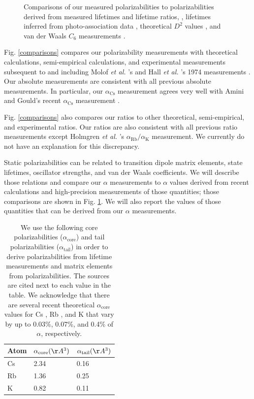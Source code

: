 \documentclass[twocolumn,prl,showpacs,superscriptaddress]{revtex4-1}   %
\newcommand{\figref}[1]{Fig. \ref{#1}}
\newcommand{\ak}{\alpha_{\textrm{K}}}
\newcommand{\arb}{\alpha_{\textrm{Rb}}}
\newcommand{\acs}{\alpha_{\textrm{Cs}}}
\newcommand{\acore}{\alpha_{\textrm{core}}}
\newcommand{\atail}{\alpha_{\textrm{tail}}}
\newcommand{\etal}{\textit{et al. }}
\begin{document}
\begin{figure}
\caption{\label{comparisonsMisc}Comparisons of our measured polarizabilities to polarizabilities derived from measured lifetimes and lifetime ratios,
\cite{Young1994,Rafac1999,Bouloufa2007,Volz2006,Simsarian1998,Wang1997,Rafac1998}, 
lifetimes inferred from photo-association data
\cite{Gabbanini2000,Gutterres2002},
theoretical $D^2$ values
\cite{Porsev2010},
and van der Waals $C_6$ measurements
\cite{Leo2000,Chin2004,Derevianko2001}.}
\end{figure}

\figref{comparisons} compares our polarizability measurements with theoretical calculations, semi-empirical calculations, and experimental measurements subsequent to and including Molof \etal's and Hall \etal's 1974 measurements \cite{Molof1974,Hall1974}. Our absolute measurements are consistent with all previous absolute measurements. In particular, our $\acs$ measurement agrees very well with Amini and Gould's recent $\acs$ measurement \cite{Amini2003}.

\figref{comparisons} also compares our ratios to other theoretical, semi-empirical, and experimental ratios. Our ratios are also consistent with all previous ratio measurements except Holmgren \etal's $\arb/\ak$ measurement. We currently do not have an explanation for this discrepancy.

Static polarizabilities can be related to transition dipole matrix elements, state lifetimes, oscillator strengths, and van der Waals coefficients. We will describe those relations and compare our $\alpha$ measurements to $\alpha$ values derived from recent calculations and high-precision measurements of those quantities; those comparisons are shown in \figref{comparisonsMisc}. We will also report the values of those quantities that can be derived from our $\alpha$ measurements.

\begingroup
\begin{table}
\caption{\label{tableCoreTail}We use the following core polarizabilities ($\acore$) and tail polarizabilities ($\atail$) in order to derive polarizabilities from lifetime measurements and matrix elements from polarizabilities. The sources are cited next to each value in the table. We acknowledge that there are several recent theoretical $\acore$ values for 
Cs \cite{Sansonetti1981,Johnson1983,Safronova1999,Derevianko2001}, 
Rb \cite{Johnson1983,Safronova1999}, and 
K \cite{Johnson1983,Muller1984}
that vary by up to 0.03\%, 0.07\%, and 0.4\% of $\alpha$, respectively.}
\begin{center}
\begin{tabular}{l l l}
\hline\hline
Atom & $\acore (\AA^3)$ & $\atail (\AA^3)$ \\
\hline
Cs & 2.34 \cite{Lim2002} & 0.16 \cite{Derevianko2001} \\
Rb & 1.36 \cite{Lim2002} & 0.25 \cite{Safronova2011} \\
K  & 0.82 \cite{Lim2002} & 0.11 \cite{Sahoo2013} \\
\hline\hline
\end{tabular}
\end{center}
\end{table}
\endgroup
\end{document}
